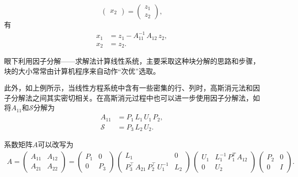 \begin{subappendices}
\begin{enumerate}
\begin{equation*}
\begin{pmatrix}
      x_{2}
    \end{pmatrix}
    =
    \begin{pmatrix}
      z_{1} \\
      z_{2}
    \end{pmatrix},
  \end{equation*}
有
\begin{equation*}
  \begin{split}
    x_{1} & = z_{1} - A_{11}^{-1} \, A_{12} \, z_{2}, \\
    x_{2} & = z_{2}.
  \end{split}
\end{equation*}
\end{enumerate}

眼下利用因子分解——求解法计算线性系统，主要采取这种块分解的思路和步骤，块的大小常常由计算机程序来自动作``次优”选取。

此外，如上例所示，当线性方程系统中含有一些密集的行、列时，高斯消元法和因子分解法之间其实密切相关。在高斯消元过程中也可以进一步使用因子分解法，如将$A_{11}$和$\mathcal{S}$分解为
\begin{equation*}
  \begin{split}
    A_{11} & = P_{1} \, L_{1} \, U_{1} \, P_{2}, \\
    \mathcal{S} & = P_{3} \, L_{2} \, U_{2}.
  \end{split}
\end{equation*}

系数矩阵$A$可以改写为
\begin{equation*}
  \begin{split}
    A =
    \begin{pmatrix}
      A_{11} & A_{12} \\
      A_{21} & A_{22}
    \end{pmatrix}
      =
      \begin{pmatrix}
        P_{1} & 0 \\
        0 & P_{3}
      \end{pmatrix}
      \,
      \begin{pmatrix}
        L_{1} & 0 \\
        P_{3}^{\top} \, A_{21} \, P_{2}^{\top} \, U_{1}^{-1} & L_{2}
      \end{pmatrix}
      \,
      \begin{pmatrix}
        U_{1} & L_{1}^{-1} \, P_{1}^{T} \, A_{12} \\
        0 & U_{2}
      \end{pmatrix}
      \,
      \begin{pmatrix}
        P_{2} & 0 \\
        0 & I
      \end{pmatrix}.
  \end{split}
\end{equation*}


\end{subappendices}

